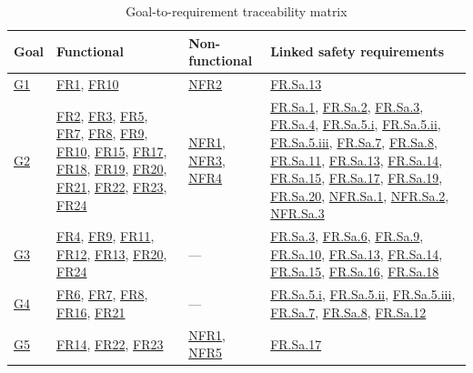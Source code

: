 \documentclass{scrreprt}
\theoremstyle{definition}
\newcommand{\reqlink}[1]{\hyperlink{req:#1}{#1}}
\begin{document}
\begin{table}[htbp]
\centering
\small
\caption{Goal-to-requirement traceability matrix}
\label{tab:goal-traceability}
\begin{tabularx}{\textwidth}{
    >{\raggedright\arraybackslash}p{0.8cm}
    >{\raggedright\arraybackslash}p{4.8cm}
    >{\raggedright\arraybackslash}p{2.0cm}
    >{\raggedright\arraybackslash}X
}
\toprule
\textbf{Goal} &
\textbf{Functional} &
\textbf{Non-functional} &
\textbf{Linked safety requirements} \\
\midrule

\reqlink{G1} &
\reqlink{FR1}, \reqlink{FR10} &
\reqlink{NFR2} &
\reqlink{FR.Sa.13} \\

\addlinespace[6pt]

\reqlink{G2} &
\reqlink{FR2}, \reqlink{FR3}, \reqlink{FR5}, \reqlink{FR7}, \reqlink{FR8}, \reqlink{FR9}, \reqlink{FR10}, \reqlink{FR15},
\reqlink{FR17}, \reqlink{FR18}, \reqlink{FR19}, \reqlink{FR20}, \reqlink{FR21}, \reqlink{FR22}, \reqlink{FR23}, \reqlink{FR24} &
\reqlink{NFR1}, \reqlink{NFR3}, \reqlink{NFR4} &
\reqlink{FR.Sa.1}, \reqlink{FR.Sa.2}, \reqlink{FR.Sa.3}, \reqlink{FR.Sa.4}, \reqlink{FR.Sa.5.i}, \reqlink{FR.Sa.5.ii}, \reqlink{FR.Sa.5.iii}, \reqlink{FR.Sa.7}, \reqlink{FR.Sa.8}, \reqlink{FR.Sa.11},
\reqlink{FR.Sa.13}, \reqlink{FR.Sa.14}, \reqlink{FR.Sa.15}, \reqlink{FR.Sa.17}, \reqlink{FR.Sa.19}, \reqlink{FR.Sa.20},
\reqlink{NFR.Sa.1}, \reqlink{NFR.Sa.2}, \reqlink{NFR.Sa.3} \\

\addlinespace[6pt]

\reqlink{G3} &
\reqlink{FR4}, \reqlink{FR9}, \reqlink{FR11}, \reqlink{FR12}, \reqlink{FR13}, \reqlink{FR20}, \reqlink{FR24} &
--- &
\reqlink{FR.Sa.3}, \reqlink{FR.Sa.6}, \reqlink{FR.Sa.9}, \reqlink{FR.Sa.10},
\reqlink{FR.Sa.13}, \reqlink{FR.Sa.14}, \reqlink{FR.Sa.15}, \reqlink{FR.Sa.16}, \reqlink{FR.Sa.18} \\

\addlinespace[6pt]

\reqlink{G4} &
\reqlink{FR6}, \reqlink{FR7}, \reqlink{FR8}, \reqlink{FR16}, \reqlink{FR21} &
--- &
\reqlink{FR.Sa.5.i}, \reqlink{FR.Sa.5.ii}, \reqlink{FR.Sa.5.iii}, \reqlink{FR.Sa.7}, \reqlink{FR.Sa.8}, \reqlink{FR.Sa.12} \\

\addlinespace[6pt]

\reqlink{G5} &
\reqlink{FR14}, \reqlink{FR22}, \reqlink{FR23} &
\reqlink{NFR1}, \reqlink{NFR5} &
\reqlink{FR.Sa.17} \\

\bottomrule
\end{tabularx}
\end{table}
\end{document}
